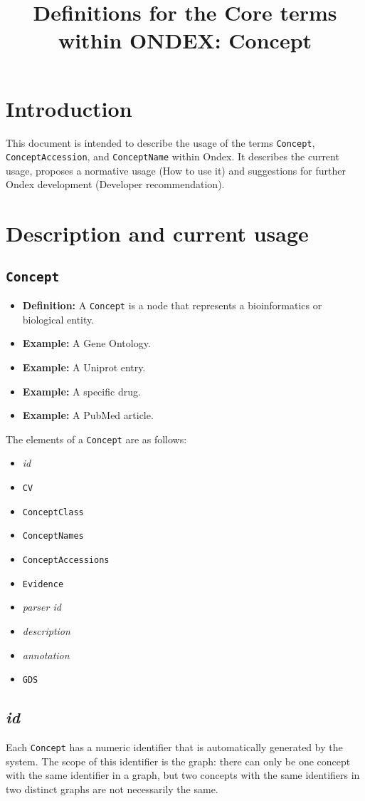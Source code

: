 \documentclass[a4paper,10pt]{article}
\title{Definitions for the Core terms within ONDEX: Concept}
\newcommand{\defn}[1]{\begin{itemize}\item\textbf{Definition: }#1\end{itemize}}
\newcommand{\example}[1]{\begin{itemize}\item\textbf{Example: }#1\xspace\end{itemize}}
\newcommand{\field}[1]{\textit{#1}\xspace}
\newcommand{\term}[1]{\texttt{#1}\xspace}
\newcommand{\co}{\term{Concept}}
\newcommand{\ca}{\term{ConceptAccession}}
\newcommand{\cn}{\term{ConceptName}}
\begin{document}
\maketitle

\section{Introduction}

This document is intended to describe the usage of the terms \co, \ca, and \cn  within Ondex. It describes the current usage, proposes a normative usage (How to use it) and suggestions for further Ondex development (Developer recommendation). 


\section{Description and current usage}

\subsection{\co}
\defn{A \co is a node that represents a bioinformatics or biological entity.}
\example{A Gene Ontology.}
\example{A Uniprot entry.}
\example{A specific drug.}
\example{A PubMed article.}


The elements of a \co are as follows:
\begin{itemize}
\item \field{id}
\item \term{CV}
\item \term{ConceptClass}
\item \term{ConceptNames}
\item \term{ConceptAccessions}
\item \term{Evidence}
\item \field{parser id}
\item \field{description}
\item \field{annotation}
\item \term{GDS}
\end{itemize}

\subsection{\field{id}}
Each \co has a numeric identifier that is automatically generated by the system. The scope of this identifier is the graph: there can only be one concept with the same identifier in a graph, but two concepts with the same identifiers in two distinct graphs are not necessarily the same.
\end{document}
